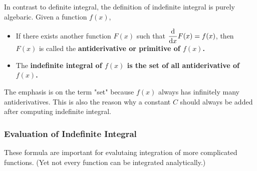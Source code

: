 \documentclass[class=article, crop=false, 12pt]{standalone}
\begin{document}
In contrast to definite integral, the definition of indefinite integral is purely algebaric. Given a function $f(x)$, 

\begin{itemize}
    \item If there exists another function $F(x)$ such that $\dvv{x}F(x) = f(x)$,
    then $F(x)$ is called the \bf{antiderivative} or \bf{primitive} of $f(x)$.

    \item The \bf{indefinite integral} of $f(x)$ is the \bf{set of all antiderivative of $f(x)$}. 
\end{itemize}

The emphasis is on the term "set" because $f(x)$ always has infinitely many antiderivatives.
This is also the reason why a constant $C$ should always be added after computing indefinite integral.



\subsubsection{Evaluation of Indefinite Integral}

These formula are important for evalutaing integration of more complicated functions.
(Yet not every function can be integrated analytically.)
\end{document}
